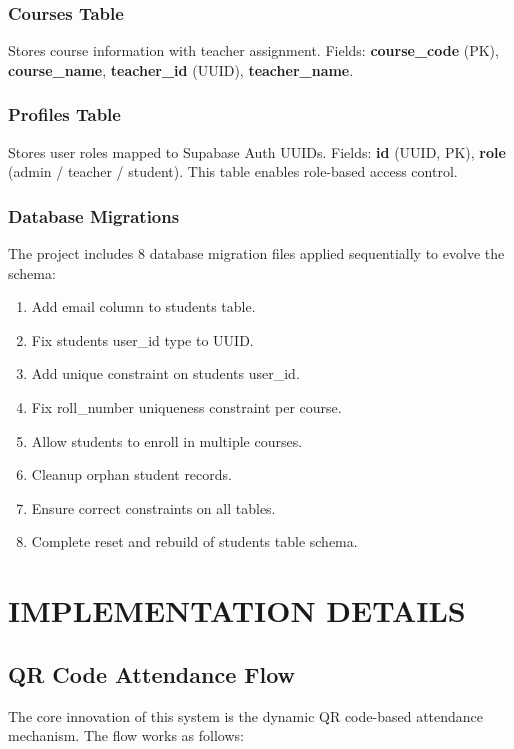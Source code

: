 \documentclass{SOICTthesis}
\begin{document}
\subsection{Courses Table}
Stores course information with teacher assignment. Fields: \textbf{course\_code} (PK), \textbf{course\_name}, \textbf{teacher\_id} (UUID), \textbf{teacher\_name}.

\subsection{Profiles Table}
Stores user roles mapped to Supabase Auth UUIDs. Fields: \textbf{id} (UUID, PK), \textbf{role} (admin / teacher / student). This table enables role-based access control.

\subsection{Database Migrations}
The project includes 8 database migration files applied sequentially to evolve the schema:

\begin{enumerate}
    \item Add email column to students table.
    \item Fix students user\_id type to UUID.
    \item Add unique constraint on students user\_id.
    \item Fix roll\_number uniqueness constraint per course.
    \item Allow students to enroll in multiple courses.
    \item Cleanup orphan student records.
    \item Ensure correct constraints on all tables.
    \item Complete reset and rebuild of students table schema.
\end{enumerate}


\chapter{IMPLEMENTATION DETAILS}
\label{ch:implementation}

\section{QR Code Attendance Flow}
\label{sec:qr_flow}

The core innovation of this system is the dynamic QR code-based attendance mechanism. The flow works as follows:
\end{document}
